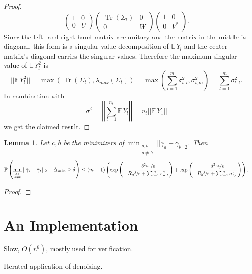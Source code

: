 \documentclass[10pt,a4paper]{article}
\newtheorem{lemma}{Lemma}
\DeclareMathOperator{\Tr}{Tr}
\begin{document}
\begin{proof}
\begin{equation*}
\begin{pmatrix}
      1 & 0\\
      0 & U
    \end{pmatrix}
    \begin{pmatrix}
      \Tr(\Sigma_{t}) & 0\\
      0 & W
    \end{pmatrix}
    \begin{pmatrix}
      1 & 0\\
      0 & V^{*}
    \end{pmatrix}.
  \end{equation*}
  Since the left- and right-hand matrix are unitary and the matrix in the middle is diagonal, this form is a singular value decomposition of $\mathbb{E}\,Y_{l}$ and the center matrix's diagonal carries the singular values.
  Therefore the maximum singular value of $\mathbb{E}\,Y_{l}^{2}$ is
  \begin{equation*}
    ||\mathbb{E}\,Y_{l}^{2}|| = \max\left( \Tr(\Sigma_{t}), \lambda_{max}(\Sigma_{t}) \right) = \max\left( \sum_{l = 1}^{m} \sigma_{t, l}^{2}, \sigma_{t, m}^{2} \right) = \sum_{l = 1}^{m} \sigma_{t, l}^{2}.
  \end{equation*}
  In combination with
  \begin{equation*}
    \sigma^{2} = \left|\left| \sum_{l = 1}^{n_{t}} \mathbb{E}\,Y_{l} \right|\right| = n_{t} \left|\left| \mathbb{E}\,Y_{1} \right|\right|
  \end{equation*}
  we get the claimed result.
\end{proof}

\vspace{.5em}
\begin{lemma}
  Let $a, b$ be the minimizers of $\min_{\substack{a, b\\a \ne b}} ||\gamma_{a} - \gamma_{b}||_{2}$.
  Then
  \begin{equation*}
    \mathbb{P}\left( \min_{\substack{s, t\\s \ne t}} ||\tilde{\gamma}_{s} - \tilde{\gamma}_{t}||_{2} - \Delta_{min} \ge \delta \right) \le (m + 1) \left( \exp\left( -\frac{\delta^{2} \nicefrac{n_{a}}{8}}{R_{a} \nicefrac{\delta}{6} + \sum_{l = 1}^{m} \sigma_{a, l}^{2}} \right) + \exp\left( -\frac{\delta^{2} \nicefrac{n_{b}}{8}}{R_{b} \nicefrac{\delta}{6} + \sum_{l = 1}^{m} \sigma_{b, l}^{2}} \right) \right).
  \end{equation*}
\end{lemma}

\begin{proof}

\end{proof}

\section{An Implementation}
\label{sec:results}

Slow, $O(n^{6})$, mostly used for verification.

Iterated application of denoising.

{}

\end{document}
